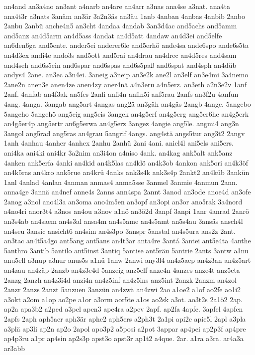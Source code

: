 {an4and
an3a4no
an3ant
a4narb
an4are
an4arr
a3nas
ana4se
a3nat.
ana4ta
ana4t3r
a3nats
3anäm
an3är
3a2n3äs
an3äu
1anb
4anban
4anbas
4anbib
2anbo
2anbu
2anbü
anche4n5
an3cht
4andaa
4andab
3an3d4ac
and5achs
and5amm
and5anz
an4d5arm
an4d5ass
4andat
an4d5att
4andaw
an4d3ei
and5elfe
an6den6ga
and5ente.
ander5ei
anderer6le
and5erhö
ande4sa
ande6spo
ande6s5ta
an4d3ex
andi4e
ando3s
and5ott
and5rai
an4drau
an4drec
an4d5res
and4sam
and4seh
and6s5ein
and6spar
and6spas
and6s5paß
and6spat
and4sph
an4düb
andys4
2ane.
an3ec
a3n4ei.
3aneig
a3neip
an3e2k
ane2l
an3elf
an3e4mi
3a4nemo
2ane2n
anen3e
anen4ze
anen4zy
aner4nä
a4n3eru
a4n5erz.
an3eth
a2n3e2v
1anf
2anf.
4anfab
an4f3ak
an5fes
2anfi
anfi4n
anfin5i
anf5rau
2anfs
an3f2u
4anfun
4ang.
4anga.
3angab
ang5art
4angas
ang2ä
an3gäh
an4gäs
2angb
4ange.
5angebo
5angeho
5angehö
ang5eig
ang5eis
3angek
an4g5erf
an4g5erg
ang5er6he
an4g5erk
an4g5er4p
ang5ertr
an6g5erwa
an4g5erz
3angez
4angie
ang5le.
angmi4
ang3n
3angol
ang5rad
ang5ras
an4grau
5angrif
4angs.
ang4stä
angs5tur
ang3t2
2angv
1anh
4anhau
4anher
4anhex
2anhu
2anhü
2ani
4ani.
aniel4l
ani5els
ani5ers.
ani4ka
ani4ki
ani4kr
3a2nim
an3i4on
a4niso
4ank.
an4kag
ank5alt
ank5anz
4anken
ank5erfa
4anki
an4kid
an4k5las
an4klö
an4k3ob
4ankon
ank5ori
an4k3öf
an4k5ras
an4kro
ank5rue
an4krü
4anks
ank3s4k
ank3s4p
2ankt2
an4küb
3ankün
1anl
4anlad
4anlan
4anman
anmas4
anma5sse
3anmel
3anmie
4anmun
2ann.
anna4ge
3annä
an4nef
anne4s
2anns
ann4spa
2annt
3anod
an3ode
anoe4d
an3ofe
2anog
a3nol
ano4l3a
an3oma
ano4m5en
an3opf
an3opi
an3or
ano5rak
3a4nord
a4no4ri
anor3t4
a3nos
an4ou
a3nov
a1nö
an3ö2d
3anpf
3anpi
1anr
4anrad
2anrö
an3s4ab
an4saem
an4s3al
ansa4m
an4s5ame
an4s5amt
an5s4au
3ansäs
ansch4l
an4seu
3ansic
ansicht6
an4sim
an4s3po
3anspr
5anstal
an4s5ura
ans2z
2ant.
an3tac
an4t5a4go
ant5ang
ant5ans
an4t3ar
anta4re
3antá
3antei
ant5e4ta
4anthe
5anthro
3antib
5antilo
ant5inst
3antiq
5antise
ant5räu
5antrie
2ants
3antw
a1nu
anu5ell
a3nup
a3nur
anus5s
a1nü
1anw
2anwi
any3l4
an4z5aep
an4z3an
an4z5art
an4zau
an4zäp
2anzb
an4z3e4d
5anzeig
anz5elf
anze4n
4anzes
anze4t
anz5eta
2anzg
2anzh
an4z3i4d
anzi4n
an4z5inf
an4z5ins
anz5int
2anzk
2anzm
an4zol
2anzr
2anzs
2anzt
5anzuen
3anzün
an4zwä
an4zwi
2ao
a1oe2
a1of
ao2fe
ao1i2
a3okt
a2om
a1op
ao2pe
a1or
a3orm
aor5te
a1os
ao2sk
a3ot.
ao3t2s
2a1ö2
2ap.
ap2a
apa3b2
a2ped
a3pel
apen3
ape4ra
a2pev
2apf.
ap2fa
4apfe.
3apfel
4apfen
2apfs
2aph
aph5aer
aph3är
aphe2
aph5ers
a2ph3t
2a1pi
api2e
apie5l
2apl
a3pla
a3plä
ap3li
ap2n
ap2o
2apol
apo3p2
a5posi
a2pot
3appar
ap4pei
ap2p3f
ap4pre
ap4p3ru
a1pr
ap4sin
ap2s3p
apst3o
apst3r
ap1t2
a4que.
2ar.
a1ra
a3ra.
ar4a3a
ar3abb
}
